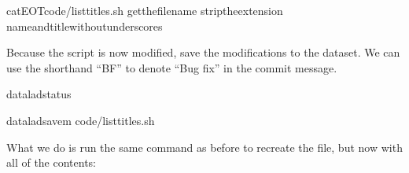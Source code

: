 %
\begin{sphinxVerbatim}[commandchars=\\\{\}]
cat\PYGZlt{}\PYGZlt{}EOT\PYGZgt{}code/list\PYGZus{}titles.sh
getthefilename
striptheextension
nameandtitlewithoutunderscores

\end{sphinxVerbatim}
\sphinxresetverbatimhllines

\sphinxAtStartPar
Because the script is now modified, save the modifications to the dataset.
We can use the shorthand “BF” to denote “Bug fix” in the commit message.

\begin{sphinxVerbatim}[commandchars=\\\{\}]
dataladstatus
\end{sphinxVerbatim}

\begin{sphinxVerbatim}[commandchars=\\\{\}]
dataladsave\PYGZhy{}m
code/list\PYGZus{}titles.sh
\end{sphinxVerbatim}

\sphinxAtStartPar
What we  do is run the same  command as before to recreate
the file, but now with all of the contents:

